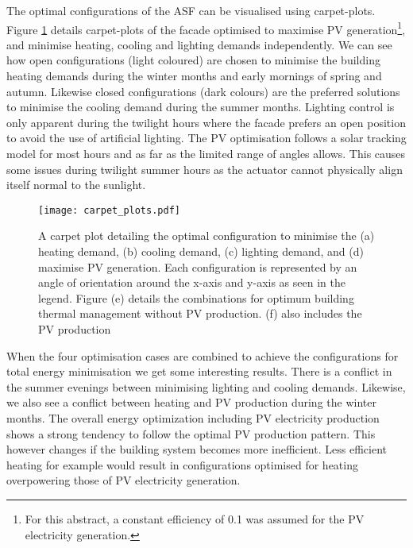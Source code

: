 


The optimal configurations of the ASF can be visualised using carpet-plots. Figure \ref{fig:carpetplot} details carpet-plots of the facade optimised to maximise PV generation\footnote{For this abstract, a constant efficiency of 0.1 was assumed for the PV electricity generation.}, and minimise heating, cooling and lighting demands independently. We can see how open configurations (light coloured) are chosen to minimise the building heating demands during the winter months and early mornings of spring and autumn. Likewise closed configurations (dark colours) are the preferred solutions to minimise the cooling demand during the summer months. Lighting control is only apparent during the twilight hours where the facade prefers an open position to avoid the use of artificial lighting. The PV optimisation follows a solar tracking model for most hours and as far as the limited range of angles allows. This causes some issues during twilight summer hours as the actuator cannot physically align itself normal to the sunlight. 

\begin{figure}[H]
\begin{center}
\texttt{[image: carpet\_plots.pdf]}
\caption{A carpet plot detailing the optimal configuration to minimise the (a) heating demand, (b) cooling demand, (c) lighting demand, and (d) maximise PV generation. Each configuration is represented by an angle of orientation around the x-axis and y-axis as seen in the legend. Figure (e) details the combinations for optimum building thermal management without PV production. (f) also includes the PV production}
\label{fig:carpetplot}
\end{center}
\end{figure}

When the four optimisation cases are combined to achieve the configurations for total energy minimisation we get some interesting results. There is a conflict in the summer evenings between minimising lighting and cooling demands. Likewise, we also see a conflict between heating and PV production during the winter months. The overall energy optimization including PV electricity production shows a strong tendency to follow the optimal PV production pattern. This however changes if the building system becomes more inefficient. Less efficient heating for example would result in configurations optimised for heating overpowering those of PV electricity generation.

